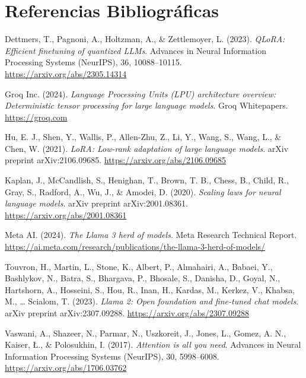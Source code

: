 \documentclass[12pt,letterpaper]{article}
\begin{document}
\newpage
\section{Referencias Bibliográficas}

\begin{singlespace}
\begin{description}
    \item Dettmers, T., Pagnoni, A., Holtzman, A., \& Zettlemoyer, L. (2023). \textit{QLoRA: Efficient finetuning of quantized LLMs}. Advances in Neural Information Processing Systems (NeurIPS), 36, 10088--10115. \url{https://arxiv.org/abs/2305.14314}
    
    \item Groq Inc. (2024). \textit{Language Processing Units (LPU) architecture overview: Deterministic tensor processing for large language models}. Groq Whitepapers. \url{https://groq.com}
    
    \item Hu, E. J., Shen, Y., Wallis, P., Allen-Zhu, Z., Li, Y., Wang, S., Wang, L., \& Chen, W. (2021). \textit{LoRA: Low-rank adaptation of large language models}. arXiv preprint arXiv:2106.09685. \url{https://arxiv.org/abs/2106.09685}
    
    \item Kaplan, J., McCandlish, S., Henighan, T., Brown, T. B., Chess, B., Child, R., Gray, S., Radford, A., Wu, J., \& Amodei, D. (2020). \textit{Scaling laws for neural language models}. arXiv preprint arXiv:2001.08361. \url{https://arxiv.org/abs/2001.08361}
    
    \item Meta AI. (2024). \textit{The Llama 3 herd of models}. Meta Research Technical Report. \url{https://ai.meta.com/research/publications/the-llama-3-herd-of-models/}
    
    \item Touvron, H., Martin, L., Stone, K., Albert, P., Almahairi, A., Babaei, Y., Bashlykov, N., Batra, S., Bhargava, P., Bhosale, S., Danisha, D., Goyal, N., Hartshorn, A., Hosseini, S., Hou, R., Inan, H., Kardas, M., Kerkez, V., Khabsa, M., \dots{} Scialom, T. (2023). \textit{Llama 2: Open foundation and fine-tuned chat models}. arXiv preprint arXiv:2307.09288. \url{https://arxiv.org/abs/2307.09288}
    
    \item Vaswani, A., Shazeer, N., Parmar, N., Uszkoreit, J., Jones, L., Gomez, A. N., Kaiser, \L., \& Polosukhin, I. (2017). \textit{Attention is all you need}. Advances in Neural Information Processing Systems (NeurIPS), 30, 5998--6008. \url{https://arxiv.org/abs/1706.03762}
\end{description}
\end{singlespace}
\end{document}
